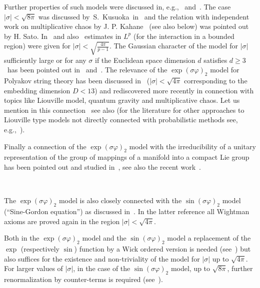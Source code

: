 \documentclass[a4paper,10pt]{article}
\begin{document}
Further properties of such models were discussed in,
e.g.,~{\cite{AHiPRoS2,AHiPRoS1,FroPa,Gie,HiKPS,Simon1974,Zegarli}}
and~{\cite{Albeverio2002,AlHKa,AFeHKL,AlLi,Liang}}. The case $| \sigma | <
\sqrt{8 \pi}$ was discussed by~S.~Kusuoka~in~{\cite{Ku}} and the relation with
independent work on multiplicative chaos by J. P. Kahane~{\cite{Ka}} (see also
below) was pointed out by H. Sato. In~{\cite{Krohn1974,AHK2}} and
also~{\cite{Simon1974}} estimates in $L^p$ (for the interaction in a bounded
region) were given for $| \sigma | < \sqrt{\frac{4 \pi}{p - 1}}$. The Gaussian
character of the model for $| \sigma |$ sufficiently large or for any $\sigma$
if the Euclidean space dimension $d$ satisfies $d \geqslant 3$ \ has been
pointed out in~{\cite{AHK2}} and~{\cite{AGaHK}}. The relevance of the $\exp
(\sigma \varphi)_2$ model for Polyakov string theory has been discussed
in~{\cite{AlKrPaSc1986,AlKrPaSc1992,AJPS}} ($| \sigma | < \sqrt{4 \pi}$
corresponding to the embedding dimension $D < 13$) and rediscovered more
recently in connection with topics like Liouville model, quantum gravity and
multiplicative chaos. Let us mention in this
connection~{\cite{AnKa,VaRhShe,RhVa}} see also
{\cite{BeShXi2014,DuSh2019,Gottschalk2013,Sha2016}} (for the literature for
other approaches to Liouville type models not directly connected with
probabilistic methods see, e.g.,~{\cite{Bahns2018}}).

Finally a connection of the $\exp (\sigma \varphi)_2$ model with the
irreducibility of a unitary representation of the group of mappings of a
manifold into a compact Lie group has been pointed out and studied
in~{\cite{AHKMT}}, see also the recent work~{\cite{AGoVe}}.

\

The $\exp (\sigma \varphi)_2$ model is also closely connected with the $\sin
(\sigma \varphi)_2$ model (``Sine-Gordon equation'') as discussed
in~{\cite{AHK3,AlHKa,FrSei}}. In the latter reference all Wightman axioms are
proved again in the region $| \sigma | < \sqrt{4 \pi}$.

Both in the $\exp (\sigma \varphi)_2$ model and the $\sin (\sigma \varphi)_2$
model a replacement of the $\exp$ (respectively $\sin$) function by a Wick
ordered version is needed (see~{\cite{AHaRu}}) but also suffices for the
existence and non-triviality of the model for $| \sigma |$ up to $\sqrt{4
\pi}$. For larger values of $| \sigma |$, in the case of the $\sin (\sigma
\varphi)_2$ model, up to $\sqrt{8 \pi}$, further renormalization by
counter-terms is required (see~{\cite{GaNi}}).
\end{document}
